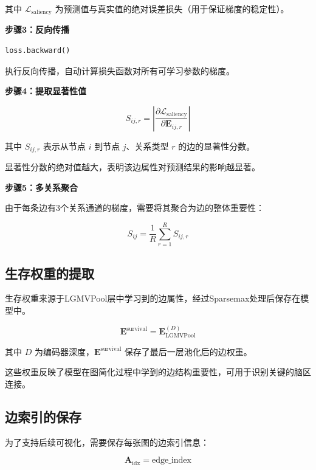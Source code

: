 \documentclass[UTF8, a4paper, 12pt]{article}
\begin{document}
其中 $\mathcal{L}_{\text{saliency}}$ 为预测值与真实值的绝对误差损失（用于保证梯度的稳定性）。

\textbf{步骤3：反向传播}

\begin{verbatim}
loss.backward()
\end{verbatim}

执行反向传播，自动计算损失函数对所有可学习参数的梯度。

\textbf{步骤4：提取显著性值}

\begin{equation}
S_{ij,r} = \left| \frac{\partial \mathcal{L}_{\text{saliency}}}{\partial \mathbf{E}_{ij,r}} \right|
\end{equation}

其中 $S_{ij,r}$ 表示从节点 $i$ 到节点 $j$、关系类型 $r$ 的边的显著性分数。

显著性分数的绝对值越大，表明该边属性对预测结果的影响越显著。

\textbf{步骤5：多关系聚合}

由于每条边有3个关系通道的梯度，需要将其聚合为边的整体重要性：

\begin{equation}
S_{ij} = \frac{1}{R} \sum_{r=1}^{R} S_{ij,r}
\end{equation}

\subsection{生存权重的提取}

生存权重来源于LGMVPool层中学习到的边属性，经过Sparsemax处理后保存在模型中。

\begin{equation}
\mathbf{E}^{\text{survival}} = \mathbf{E}^{(D)}_{\text{LGMVPool}}
\end{equation}

其中 $D$ 为编码器深度，$\mathbf{E}^{\text{survival}}$ 保存了最后一层池化后的边权重。

这些权重反映了模型在图简化过程中学到的边结构重要性，可用于识别关键的脑区连接。

\subsection{边索引的保存}

为了支持后续可视化，需要保存每张图的边索引信息：

\begin{equation}
\mathbf{A}_{\text{idx}} = \text{edge\_index}
\end{equation}
\end{document}
